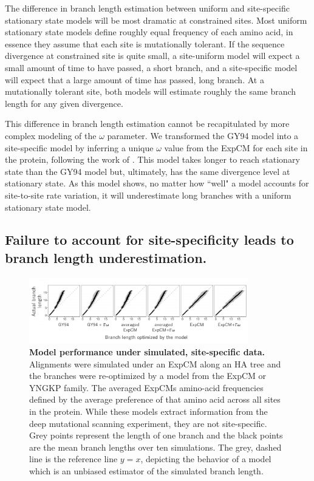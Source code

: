 \documentclass[11pt]{article}
\begin{document}
The difference in branch length estimation between uniform and site-specific stationary state models will be most dramatic at constrained sites. 
Most uniform stationary state models define roughly equal frequency of each amino acid, in essence they assume that each site is mutationally tolerant. 
If the sequence divergence at constrained site is quite small, a site-uniform model will expect a small amount of time to have passed, a short branch, and a site-specific model will expect that a large amount of time has passed, long branch. 
At a mutationally tolerant site, both models will estimate roughly the same branch length for any given divergence. 

This difference in branch length estimation cannot be recapitulated by more complex modeling of the $\omega$ parameter. 
We transformed the GY94 model into a site-specific model by inferring a unique $\omega$ value from the ExpCM for each site in the protein, following the work of \cite{spielman2015relationship}. 
This model takes longer to reach stationary state than the GY94 model but, ultimately, has the same divergence level at stationary state. 
As this model shows, no matter how ``well" a model accounts for site-to-site rate variation, it will underestimate long branches with a uniform stationary state model.  

\subsection*{Failure to account for site-specificity leads to branch length underestimation.}

\begin{figure}[H]
\centerline{\includegraphics[width=0.85\textwidth]{figures/simulations}}
\caption{\label{simulations}
\textbf{Model performance under simulated, site-specific data.} 
Alignments were simulated under an ExpCM along an HA tree and the branches were re-optimized by a model from the ExpCM or YNGKP family. 
The averaged ExpCMs amino-acid frequencies defined by the average preference of that amino acid across all sites in the protein. 
While these models extract information from the deep mutational scanning experiment, they are not site-specific. 
Grey points represent the length of one branch and the black points are the mean branch lengths over ten simulations. 
The grey, dashed line is the reference line $y=x$, depicting the behavior of a model which is an unbiased estimator of the simulated branch length. 
}
\end{figure}
\end{document}
